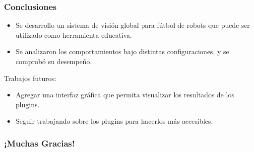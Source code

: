 \documentclass[11pt,a4paper,spanish]{beamer}
\begin{document}
\begin{frame}

\frametitle{Conclusiones}

\begin{itemize}

	\item Se desarrollo un sistema de visión global para fútbol de robots
		que puede ser utilizado como herramienta educativa.

	\item Se analizaron los comportamientos bajo distintas configuraciones,
		y se comprobó su desempeño.

\end{itemize}

Trabajos futuros:

\begin{itemize}

	\item Agregar una interfaz gráfica que permita visualizar los resultados
		de los plugins.

	\item Seguir trabajando sobre los plugins para hacerlos más accesibles.

\end{itemize}

\end{frame}

\begin{frame}

	\frametitle{¡Muchas Gracias!}

\end{frame}




\end{document}
